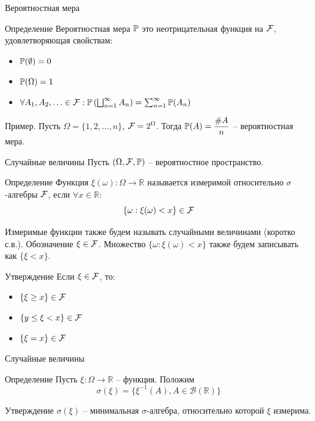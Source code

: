 \documentclass{beamer}
\begin{document}
\begin{frame}{Вероятностная мера}
    \begin{block}{Определение}
        Вероятностная мера $\mathbb{P}$ это неотрицательная функция на $\mathcal{F}$, удовлетворяющая свойствам:
        \begin{itemize}
            \item $\mathbb{P}(\emptyset) = 0$
            \item $\mathbb{P}(\Omega) = 1$
            \item $\forall A_1, A_2, \ldots \in \mathcal{F}: \mathbb{P}\left(\bigsqcup_{n=1}^{\infty}A_n\right) = \sum_{n=1}^{\infty} \mathbb{P}(A_n)$ 
        \end{itemize}
    \end{block}
    Пример. Пусть $\Omega = \{1, 2, \ldots, n\}$, $\mathcal{F}=2^{\Omega}$. Тогда $\mathbb{P}(A)=\dfrac{\#A}{n}$ -- вероятностная мера.
\end{frame}

\begin{frame}{Случайные величины}
    Пусть $(\Omega, \mathcal{\mathcal{F}}, \mathbb{P})$ -- вероятностное пространство. 
    \begin{block}{Определение}
        Функция $\xi(\omega): \Omega \to \mathbb{R}$ называется измеримой относительно $\sigma$-алгебры ${\mathcal{F}}$, если $\forall x \in \mathbb{R}$:
        $$
            \{\omega : \xi(\omega) < x \} \in {\mathcal{F}}
        $$
    \end{block}
    Измеримые функции также будем называть случайными величинами (коротко с.в.). Обозначение $\xi \in \mathcal{\mathcal{F}}$.
    Множество $\{\omega : \xi(\omega) < x \}$ также будем записывать как $\{ \xi < x\}$.

    \begin{block}{Утверждение}
    Если $\xi \in \mathcal{\mathcal{F}}$, то:
        \begin{itemize}
            \item $\{\xi \geq x \} \in {\mathcal{F}}$
            \item $\{y \leq \xi < x \} \in {\mathcal{F}}$
            \item $\{\xi = x \} \in {\mathcal{F}}$
        \end{itemize}
    \end{block}
\end{frame}

\begin{frame}{Случайные величины}
    \begin{block}{Определение}
        Пусть $\xi : \Omega\to\mathbb{R}$ -- функция.
        Положим 
        $$\sigma(\xi) = \{ \xi^{-1}(A), A\in \mathcal{B}(\mathbb{R})\}$$
    \end{block}
    \begin{block}{Утверждение}
         $\sigma(\xi)$ -- минимальная $\sigma$-алгебра, относительно которой $\xi$ измерима.
    \end{block}
\end{frame}
\end{document}
